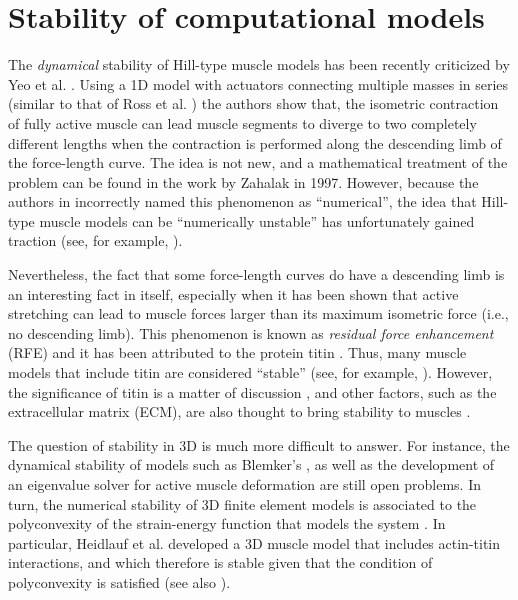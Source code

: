 \documentclass{sfuthesis}
\numberwithin{equation}{section}
\numberwithin{figure}{chapter}
\numberwithin{table}{chapter}
\theoremstyle{definition}
\begin{document}
\section{Stability of computational models}

The \textit{dynamical} stability of Hill-type muscle models has been recently criticized by Yeo et al. \cite{YeoEtAl2023NumericalInstability}. Using a 1D model with actuators connecting multiple masses in series (similar to that of Ross et al. \cite{Ross2018-1D}) the authors show that, the isometric contraction of fully active muscle can lead muscle segments to diverge to two completely different lengths when the contraction is performed along the descending limb of the force-length curve. 
The idea is not new, and a mathematical treatment of the problem can be found in the work by Zahalak \cite{Zahalak1997} in 1997. However, because the authors in \cite{YeoEtAl2023NumericalInstability} incorrectly named this phenomenon as ``numerical'', the idea that Hill-type muscle models can be ``numerically unstable'' has unfortunately gained traction (see, for example, \cite{Mendoza2025,SampaioDeOliveiraUchida2025}). 

Nevertheless, the fact that some force-length curves do have a descending limb is an interesting fact in itself, especially when it has been shown that active stretching can lead to muscle forces larger than its maximum isometric force (i.e., no descending limb). This phenomenon is known as \textit{residual force enhancement} (RFE) \cite{HerzogLeonard2002} and it has been attributed to the protein titin \cite{Herzog2014Titin}. Thus, many muscle models that include titin are considered ``stable'' (see, for example, \cite{HeidlaufEtAl2017,Millard2024,SampaioDeOliveiraUchida2025}). However, the significance of titin is a matter of discussion \cite{Lieber2018NotTitin}, and other factors, such as the extracellular matrix (ECM), are also thought to bring stability to muscles \cite{GilliesLieber2011ECM}.

The question of stability in 3D is much more difficult to answer. For instance, the dynamical stability of models such as Blemker's \cite{BlemkerPinskyDelp2005}, as well as the development of an eigenvalue solver for active muscle deformation are still open problems. In turn, the numerical stability of 3D finite element models is associated to the polyconvexity of the strain-energy function that models the system \cite{SchroderNeff2003}. In particular, Heidlauf et al. \cite{HeidlaufEtAl2017} developed a 3D muscle model that includes actin-titin interactions, and which therefore is stable given that the condition of polyconvexity is satisfied (see also \cite{SampaioDeOliveiraUchida2025}).
\end{document}
